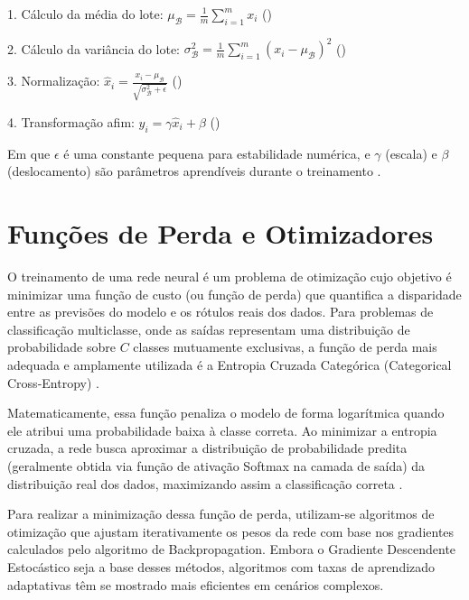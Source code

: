 1. Cálculo da média do lote: \quad $\displaystyle \mu_{\mathcal{B}} = \frac{1}{m} \sum_{i=1}^{m} x_i$ \hfill {}(\theequation)\label{eq:eq5}

2. Cálculo da variância do lote: \quad $\displaystyle \sigma_{\mathcal{B}}^2 = \frac{1}{m} \sum_{i=1}^{m} (x_i - \mu_{\mathcal{B}})^2$ \hfill {}(\theequation)\label{eq:eq6}

3. Normalização: \quad $\displaystyle \hat{x}_i = \frac{x_i - \mu_{\mathcal{B}}}{\sqrt{\sigma_{\mathcal{B}}^2 + \epsilon}}$ \hfill {}(\theequation)\label{eq:eq7}

4. Transformação afim: \quad $\displaystyle y_i = \gamma \hat{x}_i + \beta$ \hfill {}(\theequation)\label{eq:eq8}

Em que $\epsilon$ é uma constante pequena para estabilidade numérica, e $\gamma$ (escala) e $\beta$ (deslocamento) são parâmetros aprendíveis durante o 
treinamento .

\section{Funções de Perda e Otimizadores}

O treinamento de uma rede neural é um problema de otimização cujo objetivo é minimizar uma função de custo (ou função de perda) que quantifica a 
disparidade entre as previsões do modelo e os rótulos reais dos dados. Para problemas de classificação multiclasse, onde as saídas representam uma 
distribuição de probabilidade sobre $C$ classes mutuamente exclusivas, a função de perda mais adequada e amplamente utilizada é a Entropia Cruzada 
Categórica (Categorical Cross-Entropy) .

Matematicamente, essa função penaliza o modelo de forma logarítmica quando ele atribui uma probabilidade baixa à classe correta. Ao minimizar a 
entropia cruzada, a rede busca aproximar a distribuição de probabilidade predita (geralmente obtida via função de ativação Softmax na camada de saída) 
da distribuição real dos dados, maximizando assim a classificação correta .

Para realizar a minimização dessa função de perda, utilizam-se algoritmos de otimização que ajustam iterativamente os pesos da rede com base nos 
gradientes calculados pelo algoritmo de Backpropagation. Embora o Gradiente Descendente Estocástico seja a base desses métodos, algoritmos com taxas 
de aprendizado adaptativas têm se mostrado mais eficientes em cenários complexos.

